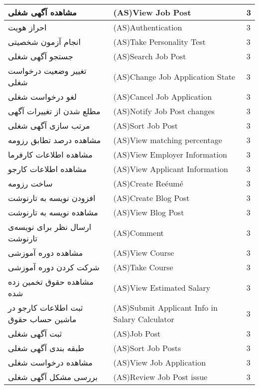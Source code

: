 \documentclass[12pt]{article}
\begin{document}
\begin{center}
\begin{table}[]
\begin{tabular}{|l|l|l|}
				\hline
				مشاهده آگهی شغلی & (AS)View Job Post & 3     \\
				\hline
				احراز هویت & (AS)Authentication & 3     \\
				\hline
				انجام آزمون شخصیتی & (AS)Take Personality Test & 3     \\
				\hline
				جستجو آگهی شغلی & (AS)Search Job Post & 3     \\
				\hline
				تغییر وضعیت درخواست شغلی & (AS)Change Job Application State & 3     \\
				\hline
				لغو درخواست شغلی & (AS)Cancel Job Application & 3     \\
				\hline
				مطلع شدن از تغییرات آگهی‌ & (AS)Notify Job Post changes & 3     \\
				\hline
				مرتب سازی آگهی شغلی & (AS)Sort Job Post & 3     \\
				\hline
				مشاهده درصد تطابق رزومه & (AS)View matching percentage & 3     \\
				\hline
				مشاهده اطلاعات کارفرما & (AS)View Employer Information & 3     \\
				\hline
				مشاهده اطلاعات کارجو & (AS)View Applicant Information & 3     \\
				\hline
				ساخت رزومه & (AS)Create Reéumé & 3     \\
				\hline
				افزودن نویسه به تارنوشت & (AS)Create Blog Post & 3     \\
				\hline
				مشاهده نویسه به تارنوشت & (AS)View Blog Post & 3     \\
				\hline
				ارسال نظر برای نویسه‌ی تارنوشت & (AS)Comment & 3     \\
				\hline
				مشاهده دوره آموزشی & (AS)View Course & 3     \\
				\hline
				شرکت کردن دوره آموزشی & (AS)Take Course & 3     \\
				\hline
				مشاهده حقوق تخمین زده شده & (AS)View Estimated Salary & 3     \\
				\hline
				ثبت اطلاعات کارجو در ماشین حساب حقوق & (AS)Submit Applicant Info in Salary Calculator & 3     \\
				\hline
				ثبت آگهی شغلی & (AS)Job Post & 3     \\
				\hline
				طبقه بندی آگهی شغلی & (AS)Sort Job Posts & 3     \\
				\hline
				مشاهده درخواست شغلی & (AS)View Job Application & 3     \\
				\hline
				بررسی مشکل آگهی شغلی & (AS)Review Job Post issue & 3     \\
				\hline

\end{tabular}
\end{table}
\end{center}
\end{document}
